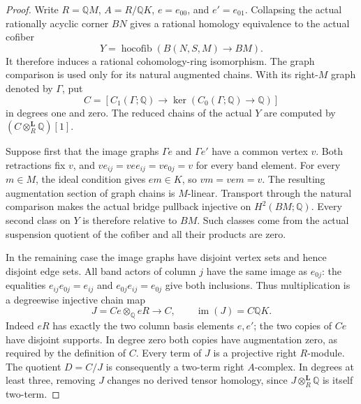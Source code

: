 \begin{proof}
Write $R=\mathbb QM$, $A=R/\mathbb QK$, $e=e_{00}$, and $e'=e_{01}$.
Collapsing the actual rationally acyclic corner $BN$ gives a rational
homology equivalence to the actual cofiber
\[
 Y=\operatorname{hocofib}(B(N,S,M)\longrightarrow BM).
\]
It therefore induces a rational cohomology-ring isomorphism.
The graph comparison is used only for its natural augmented chains.
With its right-$M$ graph denoted by $\Gamma$, put
\[
 C=[C_1(\Gamma;\mathbb Q)\longrightarrow
       \ker(C_0(\Gamma;\mathbb Q)\to\mathbb Q)]
\]
in degrees one and zero.  The reduced chains of the actual $Y$ are
computed by $(C\otimes_R^{\mathbf L}\mathbb Q)[1]$.

Suppose first that the image graphs $\Gamma e$ and $\Gamma e'$
have a common vertex $v$.  Both retractions fix $v$, and
$ve_{ij}=vee_{ij}=ve_{0j}=v$ for every band element.
For every $m\in M$, the ideal condition gives $em\in K$, so
$vm=vem=v$.  The resulting augmentation section of graph chains
is $M$-linear.  Transport through the natural comparison makes the
actual bridge pullback injective on $H^2(BM;\mathbb Q)$.
Every second class on $Y$ is therefore relative to $BM$.
Such classes come from the actual suspension quotient of the
cofiber and all their products are zero.

In the remaining case the image graphs have disjoint vertex sets
and hence disjoint edge sets.  All band actors of column $j$ have
the same image as $e_{0j}$: the equalities
$e_{ij}e_{0j}=e_{ij}$ and $e_{0j}e_{ij}=e_{0j}$ give both inclusions.
Thus multiplication is a degreewise injective chain map
\[
 J=Ce\otimes_{\mathbb Q}eR\longrightarrow C,
 \qquad \operatorname{im}(J)=C\mathbb QK.
\]
Indeed $eR$ has exactly the two column basis elements $e,e'$;
the two copies of $Ce$ have disjoint supports.  In degree zero
both copies have augmentation zero, as required by the definition
of $C$.  Every term of $J$ is a projective right $R$-module.
The quotient $D=C/J$ is consequently a two-term right $A$-complex.
In degrees at least three, removing $J$ changes no derived tensor
homology, since $J\otimes_R^{\mathbf L}\mathbb Q$ is itself two-term.


\end{proof}
